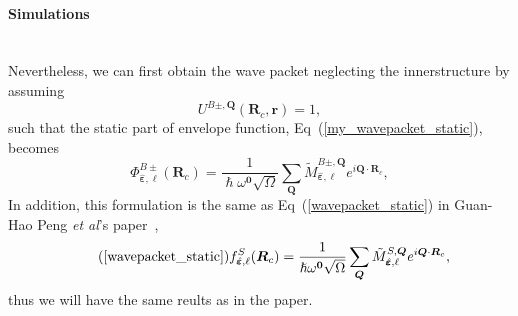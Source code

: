 \vspace{-1em}
\paragraph*{Simulations}~\\
\vspace{-1em}
Nevertheless, we can first obtain the wave packet neglecting the innerstructure by assuming 
$$
U^{B\pm,\boldsymbol{Q}} (\boldsymbol{R}_c,\boldsymbol{r})=1,
$$
such that the static part of envelope function, Eq~(\ref{my_wavepacket_static}), becomes
\begin{equation}
\Phi^{B\pm}_{\hat{\boldsymbol{\varepsilon}}, \ell}(\boldsymbol{R}_c)
=
\frac{1}{ \hslash \omega^{\boldsymbol{0}} \sqrt{\Omega}}
\sum_{\boldsymbol{Q}}
\tilde{M}_{\hat{\boldsymbol{\varepsilon}}, \ell}^{B\pm,\boldsymbol{Q}}
e^{i\boldsymbol{Q}\cdot\boldsymbol{R}_c},
\label{envelope_valley_B}
\end{equation}
In addition, this formulation is the same as Eq~(\ref{wavepacket_static}) in Guan-Hao Peng \textit{et al}'s paper~\cite{peng2022tailoring},
\begin{equation}
\tag{\ref{wavepacket_static}}
f^{S}_{\hat{\boldsymbol{\varepsilon}}, \ell}(\boldsymbol{R}_c)
=
\frac{1}{\hslash \omega^{\boldsymbol{0}} \sqrt{\Omega}}
\sum_{\boldsymbol{Q}}
\tilde{M}_{\hat{\boldsymbol{\varepsilon}}, \ell}^{S,\boldsymbol{Q}}
e^{i\boldsymbol{Q}\cdot\boldsymbol{R}_c},
\end{equation}
thus we will have the same reults as in the paper.

